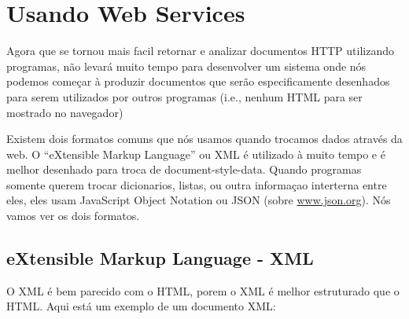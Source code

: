 
\chapter{Usando Web Services}

Agora que se tornou mais facil retornar e analizar documentos
HTTP utilizando programas, não levará muito tempo para desenvolver
um sistema onde nós podemos começar à produzir documentos que serão
especificamente desenhados para serem utilizados por outros
programas (i.e., nenhum HTML para ser mostrado no navegador)

Existem dois formatos comuns que nós usamos quando trocamos dados através da web.
O ``eXtensible Markup Language'' ou XML é utilizado à muito tempo
e é melhor desenhado para troca de document-style-data. Quando programas somente
querem trocar dicionarios, listas, ou outra informaçao interterna entre eles, 
eles usam JavaScript Object Notation ou JSON (sobre \url{www.json.org}).
Nós vamos ver os dois formatos.

\section{eXtensible Markup Language - XML}

O XML é bem parecido com o HTML, porem o XML é melhor estruturado
que o HTML. Aqui está um exemplo de um documento XML:

